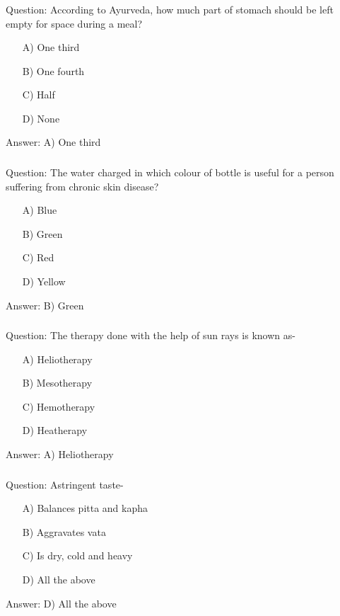 \begin{frame}[fragile]\frametitle{}

Question: According to Ayurveda, how much part of stomach should be left empty for space during a meal?

\begin{itemize}
\item[A)] One third
\item[B)] One fourth
\item[C)] Half
\item[D)] None
\end{itemize}

Answer: A) One third
\end{frame}

\begin{frame}[fragile]\frametitle{}

Question: The water charged in which colour of bottle is useful for a person suffering from chronic skin disease?

\begin{itemize}
\item[A)] Blue
\item[B)] Green
\item[C)] Red
\item[D)] Yellow
\end{itemize}

Answer: B) Green
\end{frame}

\begin{frame}[fragile]\frametitle{}

Question: The therapy done with the help of sun rays is known as-

\begin{itemize}
\item[A)] Heliotherapy
\item[B)] Mesotherapy
\item[C)] Hemotherapy
\item[D)] Heatherapy
\end{itemize}

Answer: A) Heliotherapy
\end{frame}

\begin{frame}[fragile]\frametitle{}

Question: Astringent taste-

\begin{itemize}
\item[A)] Balances pitta and kapha
\item[B)] Aggravates vata
\item[C)] Is dry, cold and heavy
\item[D)] All the above
\end{itemize}

Answer: D) All the above
\end{frame}

